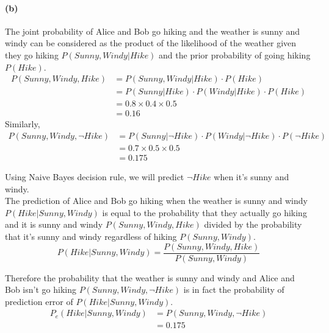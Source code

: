 \documentclass[a4paper]{article}
\begin{document}
\paragraph{(b)} The joint probability of Alice and Bob go hiking and the weather is sunny and windy can be considered as the product of the likelihood of the weather given they go hiking $P(Sunny, Windy | Hike)$ and the prior probability of going hiking $P(Hike)$.\\
	\begin{align}
		P(Sunny, Windy, Hike) &= P(Sunny, Windy | Hike) \cdot P(Hike)\\
			&= P(Sunny | Hike) \cdot P(Windy | Hike) \cdot P(Hike)\\
			&= 0.8 \times 0.4 \times 0.5\\
			&= 0.16
	\end{align}
	Similarly,
	\begin{align}
		P(Sunny, Windy, \neg Hike) &= P(Sunny | \neg Hike) \cdot P(Windy | \neg Hike) \cdot P(\neg Hike)\\
			&= 0.7 \times 0.5 \times 0.5\\
			&= 0.175
	\end{align}
	
	Using Naive Bayes decision rule, we will predict $\neg Hike$ when it's sunny and windy.\\
	
	The prediction of Alice and Bob go hiking when the weather is sunny and windy $P(Hike|Sunny, Windy)$ is equal to the probability that they actually go hiking and it is sunny and windy $P(Sunny, Windy, Hike)$ divided by the probability that it's sunny and windy regardless of hiking $P(Sunny, Windy)$.
	$$ P(Hike|Sunny, Windy) = \frac{P(Sunny, Windy, Hike)}{P(Sunny, Windy)} $$
	
	Therefore the probability that the weather is sunny and windy and Alice and Bob isn't go hiking $P(Sunny, Windy, \neg Hike)$ is in fact the probability of prediction error of $P(Hike|Sunny, Windy)$. 
	\begin{align}
		P_e(Hike|Sunny, Windy) &= P(Sunny, Windy,\neg Hike) \\
			&= 0.175
	\end{align}
\end{document}
